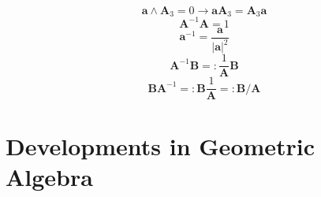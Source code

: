 \documentclass[11pt, a4paper, fleqn]{report}
\numberwithin{equation}{section}
\def\*#1{\mathbf{#1}}
\begin{document}
\begin{equation}\tag{1.7.14b}
    \*a\wedge\*A_3=0\rightarrow\*a\*A_3=\*A_3\*a
\end{equation}
\setcounter{equation}{14}%
\begin{equation}
    \*A^{-1}\*A=1
\end{equation}
\begin{equation}
    \*a^{-1}=\frac{\*a}{|\*a|^2}
\end{equation}
\begin{equation}
    \*A^{-1}\*B=:\frac{1}{\*A}\*B
\end{equation}
\begin{equation}
    \*B\*A^{-1}=:\*B\frac{1}{\*A}=:\*B/\*A
\end{equation}


\chapter{Developments in Geometric Algebra}
\end{document}
